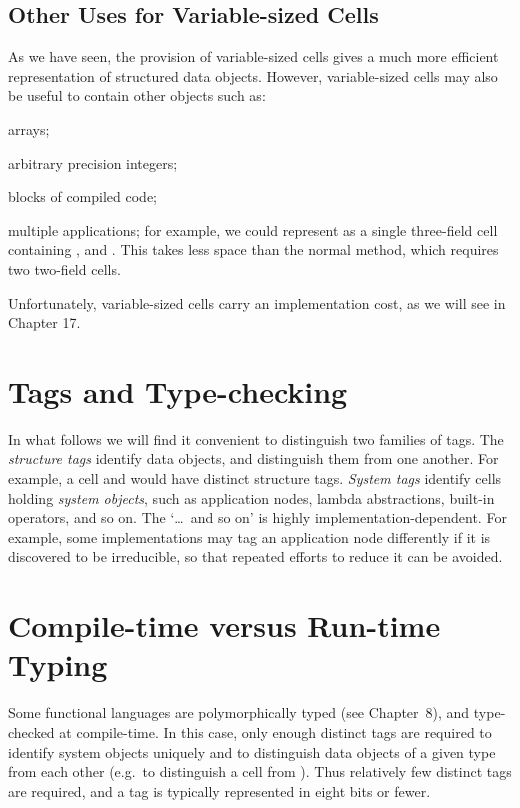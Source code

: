 \subsection{Other Uses for Variable-sized Cells}

As we have seen, the provision of variable-sized cells gives a much more
efficient representation of structured data objects. However, variable-sized
cells may also be useful to contain other objects such as:
\begin{numbered}
    \item arrays;
    \item arbitrary precision integers;
    \item blocks of compiled code;
    \item multiple applications; for example, we could represent  as a single
    three-field cell containing ,  and . This takes less space than the normal
    method, which requires two two-field cells.
\end{numbered}
Unfortunately, variable-sized cells carry an implementation cost, as we will
see in Chapter 17.

\section{Tags and Type-checking}

In what follows we will find it convenient to distinguish two families of tags.
The \textit{structure tags} identify data objects, and distinguish them from one
another. For example, a  cell and  would have distinct structure tags.
\textit{System tags} identify cells holding \textit{system objects}, such as application nodes,
lambda abstractions, built-in operators, and so on. The `\ldots\ and so on' is
highly implementation-dependent. For example, some implementations may
tag an application node differently if it is discovered to be irreducible, so that
repeated efforts to reduce it can be avoided.

\section{Compile-time versus Run-time Typing}

Some functional languages are polymorphically typed (see Chapter~8), and
type-checked at compile-time. In this case, only enough distinct tags are
required to identify system objects uniquely and to distinguish data objects of
a given type from each other (e.g.\ to distinguish a  cell from ). Thus
relatively few distinct tags are required, and a tag is typically represented in
eight bits or fewer.

